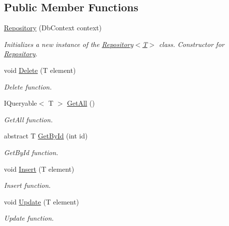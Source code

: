 \subsection*{Public Member Functions}
\begin{DoxyCompactItemize}
\item 
\mbox{\hyperlink{class_game_1_1_repository_a4e05519fae5c877e6903dcd1c9c1994a}{Repository}} (Db\+Context context)
\begin{DoxyCompactList}\small\item\em Initializes a new instance of the \mbox{\hyperlink{class_game_1_1_repository_a4e05519fae5c877e6903dcd1c9c1994a}{Repository$<$\+T$>$}} class. Constructor for \mbox{\hyperlink{class_game_1_1_repository}{Repository}}. \end{DoxyCompactList}\item 
void \mbox{\hyperlink{class_game_1_1_repository_a2fe431d36160d7457344d6f8023b19d9}{Delete}} (T element)
\begin{DoxyCompactList}\small\item\em Delete function. \end{DoxyCompactList}\item 
I\+Queryable$<$ T $>$ \mbox{\hyperlink{class_game_1_1_repository_aea664d07612f5e08ceccd602a4b900da}{Get\+All}} ()
\begin{DoxyCompactList}\small\item\em Get\+All function. \end{DoxyCompactList}\item 
abstract T \mbox{\hyperlink{class_game_1_1_repository_aa59d0df964f75cb36b0cf39e55bdb626}{Get\+By\+Id}} (int id)
\begin{DoxyCompactList}\small\item\em Get\+By\+Id function. \end{DoxyCompactList}\item 
void \mbox{\hyperlink{class_game_1_1_repository_ae6382abbe87ee7fb27ff74103459b3ed}{Insert}} (T element)
\begin{DoxyCompactList}\small\item\em Insert function. \end{DoxyCompactList}\item 
void \mbox{\hyperlink{class_game_1_1_repository_a798084f6c10a2603f2be991ef872b072}{Update}} (T element)
\begin{DoxyCompactList}\small\item\em Update function. \end{DoxyCompactList}\end{DoxyCompactItemize}
